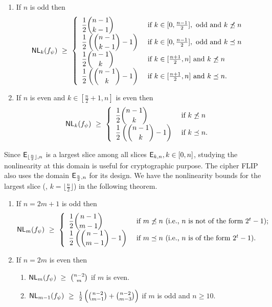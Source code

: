 \documentclass{llncs}
\begin{document}
\begin{theorem}\label{thm:NLk_bound2}
\begin{enumerate}
\item If $n$ is odd then
$$\mathsf{NL}_{k}(f_\psi) ~\geq ~ 
\left\{ \begin{array}{ll}
\displaystyle{\frac{1}{2}{n-1 \choose k-1}}  & \text{ if }  k \in [0,\frac{n-1}{2}], \text{ odd and } k \not\preceq n \\
\displaystyle{\frac{1}{2}\left({n-1 \choose k-1} - 1\right)} & \text{ if } k \in [0,\frac{n-1}{2}], \text{ odd and } k \preceq n \\
\displaystyle{\frac{1}{2}{n-1 \choose k}}  & \text{ if }  k \in [\frac{n+1}{2},n] \text{ and } k \not\preceq n \\
\displaystyle{\frac{1}{2}\left({n-1 \choose k} - 1\right)}  & \text{ if }  k \in [\frac{n+1}{2},n] \text{ and } k \preceq n.
\end{array}  \right.$$
\item If $n$ is even and $k \in [\frac{n}{2}+1, n]$ is even then 
$$\mathsf{NL}_{k}(f_\psi) ~\geq ~ 
\left\{ \begin{array}{ll}
\displaystyle{\frac{1}{2}{n-1 \choose k}}  & \text{ if }  k \not\preceq n \\
\displaystyle{\frac{1}{2}\left({n-1 \choose k} - 1\right)} & \text{ if } k \preceq n.
\end{array}  \right.$$
\end{enumerate}
\end{theorem}

Since $\mathsf{E}_{\lfloor\frac{n}{2}\rfloor,n}$ is a largest slice among all slices $\mathsf{E}_{k,n}, k \in [0,n]$, studying the nonlinearity at this domain is useful for cryptographic purpose. The cipher FLIP also uses the domain $\mathsf{E}_{\frac{n}{2},n}$ for its design. We have the nonlinearity bounds for the largest slice (\ie, $k = \lfloor\frac{n}{2}\rfloor$) in the following theorem.
\begin{theorem}\label{thm:NLk_boundm}
\begin{enumerate}
\item If $n = 2m+1$ is odd then
$$\mathsf{NL}_{m}(f_\psi) ~\geq ~ 
\left\{ \begin{array}{ll}
\displaystyle{\frac{1}{2}{n-1 \choose m-1}}  & \text{ if }  m \not\preceq n ~(\text{i.e., } n \text{ is not of the form } 2^t-1); \\
\displaystyle{\frac{1}{2}\left({n-1 \choose m-1} - 1\right)} & \text{ if } m \preceq n ~(\text{i.e., } n \text{ is of the form } 2^t-1).
\end{array}  \right.$$
\item If $n = 2m$ is even then 
\begin{enumerate}
 \item $\mathsf{NL}_{m}(f_\psi) ~\geq ~ {n-2 \choose m}$ if $m$ is even.
 \item $\mathsf{NL}_{m-1}(f_\psi) ~\geq ~ \frac{1}{2}\left({n-2 \choose m-1} + {n-2 \choose m-3}\right)$ if $m$ is odd and $n \geq 10$.
\end{enumerate}
\end{enumerate}
\end{theorem}
\end{document}
